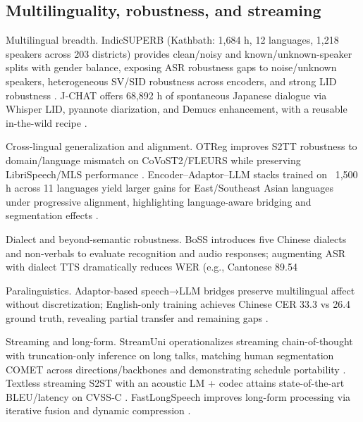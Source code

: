 \documentclass{article}
\begin{document}
\subsection{Multilinguality, robustness, and streaming} \label{subsec:Multilinguality, robustness, and streaming}

Multilingual breadth. IndicSUPERB (Kathbath: 1,684 h, 12 languages, 1,218 speakers across 203 districts) provides clean/noisy and known/unknown-speaker splits with gender balance, exposing ASR robustness gaps to noise/unknown speakers, heterogeneous SV/SID robustness across encoders, and strong LID robustness \cite{entry2025indicsuperbspeechprocessinguniversalperf}. J‑CHAT offers 68,892 h of spontaneous Japanese dialogue via Whisper LID, pyannote diarization, and Demucs enhancement, with a reusable in-the-wild recipe \cite{nakata2024jchatjapaneselargescalespokendialoguecor}.

Cross-lingual generalization and alignment. OTReg improves S2TT robustness to domain/language mismatch on CoVoST2/FLEURS while preserving LibriSpeech/MLS performance \cite{xu2025optimaltransportregularizationspeechtext}. Encoder–Adaptor–LLM stacks trained on ~1,500 h across 11 languages yield larger gains for East/Southeast Asian languages under progressive alignment, highlighting language-aware bridging and segmentation effects \cite{nguyen2025qwenvsgemmaintegrationwhispercomparative}.

Dialect and beyond-semantic robustness. BoSS introduces five Chinese dialects and non‑verbals to evaluate recognition and audio responses; augmenting ASR with dialect TTS dramatically reduces WER (e.g., Cantonese 89.54%

Paralinguistics. Adaptor-based speech→LLM bridges preserve multilingual affect without discretization; English-only training achieves Chinese CER 33.3 vs 26.4 ground truth, revealing partial transfer and remaining gaps \cite{wang2024blspemotowardsempatheticlargespeechlangu,zhu2024generativepretrainedspeechlanguagemodele}.

Streaming and long-form. StreamUni operationalizes streaming chain-of-thought with truncation-only inference on long talks, matching human segmentation COMET across directions/backbones and demonstrating schedule portability \cite{guo2025streamuniachievingstreamingspeechtransla}. Textless streaming S2ST with an acoustic LM + codec attains state-of-the-art BLEU/latency on CVSS‑C \cite{zhao2024textlessstreamingspeechtranslationsemant}. FastLongSpeech improves long-form processing via iterative fusion and dynamic compression \cite{guo2025fastlongspeechenhancinglargespeechlangua}.
\end{document}
